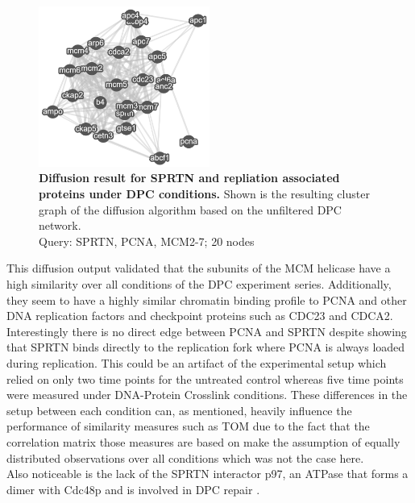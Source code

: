 \begin{figure}[H]
    \centering
    \includegraphics[width=0.5\textwidth]{resources/images/Results/sprtn_mcm_pcna_diffusion.PNG}
    \caption[Diffusion result for SPRTN and repliation associated proteins under DPC conditions]{\textbf{Diffusion result for SPRTN and repliation associated proteins under DPC conditions. }Shown is the resulting cluster graph of the diffusion algorithm based on the unfiltered DPC network.\\Query: SPRTN, PCNA, MCM2-7; 20 nodes}
    \label{fig:sprtn_cluster}
\end{figure}
This diffusion output validated that the subunits of the MCM helicase have a high similarity over all conditions of the DPC experiment series. Additionally, they seem to have a highly similar chromatin binding profile to PCNA and other DNA replication factors and checkpoint proteins such as CDC23 and CDCA2. Interestingly there is no direct edge between PCNA and SPRTN despite \cite{Vaz.2016} showing that SPRTN binds directly to the replication fork where PCNA is always loaded during replication. 
This could be an artifact of the experimental setup which relied on only two time points for the untreated control whereas five time points were measured under DNA-Protein Crosslink conditions. These differences in the setup between each condition can, as mentioned, heavily influence the performance of similarity measures such as TOM due to the fact that the correlation matrix those measures are based on make the assumption of equally distributed observations over all conditions which was not the case here.\\
Also noticeable is the lack of the SPRTN interactor p97, an ATPase that forms a dimer with Cdc48p and is involved in DPC repair \citep{Larsen.2019,Woodman.2003}. 
